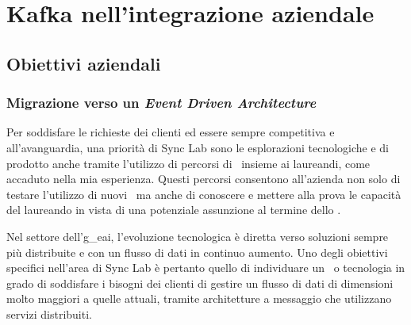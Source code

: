 \chapter{Kafka nell’integrazione aziendale}

\section{Obiettivi aziendali}
\subsection{Migrazione verso un \textit{Event Driven Architecture}}

Per soddisfare le richieste dei clienti ed essere sempre competitiva e all'avanguardia, una priorità di Sync Lab sono le esplorazioni tecnologiche e di prodotto anche tramite l'utilizzo di percorsi di \stage\ insieme ai laureandi, come accaduto nella mia esperienza.
Questi percorsi consentono all'azienda non solo di testare l'utilizzo di nuovi \software\ ma anche di conoscere e mettere alla prova le capacità del laureando in vista di una potenziale assunzione al termine dello \stage.

Nel settore dell'\gls{g_eai}, l'evoluzione tecnologica è diretta verso soluzioni sempre più distribuite e con un flusso di dati in continuo aumento.
Uno degli obiettivi specifici nell'area  di Sync Lab è pertanto quello di individuare un \software\ o tecnologia in grado di soddisfare i bisogni dei clienti di gestire un flusso di dati di dimensioni molto maggiori a quelle attuali, tramite architetture a messaggio che utilizzano servizi distribuiti.

